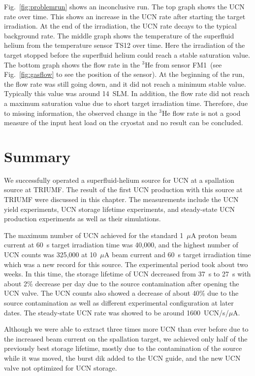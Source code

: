 Fig.~\ref{fig:problemrun} shows an inconclusive run. The top graph
shows the UCN rate over time. This shows an increase in the UCN rate
after starting the target irradiation. At the end of the irradiation,
the UCN rate decays to the typical background rate. The middle graph
shows the temperature of the superfluid helium from the temperature
sensor TS12 over time. Here the irradiation of the target stopped
before the superfluid helium could reach a stable saturation
value. The bottom graph shows the flow rate in the $^3$He from sensor
FM1~(see Fig.~\ref{fig:gasflow} to see the position of the sensor). At
the beginning of the run, the flow rate was still going down, and it
did not reach a minimum stable value. Typically this value was around
14~SLM. In addition, the flow rate did not reach a maximum saturation
value due to short target irradiation time. Therefore, due to missing
information, the observed change in the $^3$He flow rate is not a good
measure of the input heat load on the cryostat and no result can be
concluded.


\section{Summary}
We successfully operated a superfluid-helium source for UCN at a
spallation source at TRIUMF. The result of the first UCN production
with this source at TRIUMF were discussed in this
chapter. The measurements include the UCN yield experiments, UCN
storage lifetime experiments, and steady-state UCN production
experiments as well as their simulations.

The maximum number of UCN achieved for the standard 1~$\mu$A proton
beam current at 60~s target irradiation time was 40,000, and the
highest number of UCN counts was 325,000 at 10~$\mu$A beam current and
60~s target irradiation time which was a new record for this
source. The experimental period took about two weeks. In this time,
the storage lifetime of UCN decreased from 37~s to 27~s with about 2\%
decrease per day due to the source contamination after opening the UCN
valve. The UCN counts also showed a decrease of about 40\% due to the
source contamination as well as different experimental configuration
at later dates. The steady-state UCN rate was showed to be around
1600~UCN/s/$\mu$A.

Although we were able to extract three times more UCN than ever before
due to the increased beam current on the spallation target, we
achieved only half of the previously best storage lifetime, mostly due
to the contamination of the source while it was moved, the burst dik
added to the UCN guide, and the new UCN valve not optimized for UCN
storage.

